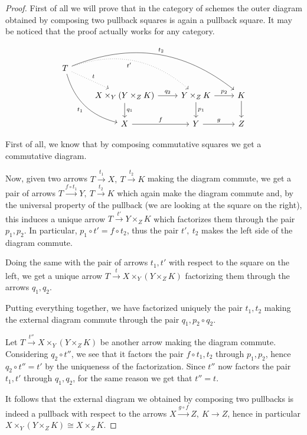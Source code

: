 \documentclass{article}
\begin{document}
\begin{proof}
    First of all we will prove that in the category of schemes the outer
    diagram obtained by composing two pullback squares is again a pullback
    square. It may be noticed that the proof actually works for any
    category.
    \[
	\begin{tikzcd}
        	T\arrow[bend left]{drrr}{t_2}\arrow[dotted, bend left, swap]{drr}{t'}\arrow[dotted]{dr}{t}\arrow[bend right, swap]{ddr}{t_1} \\
		& X\times_Y (Y\times_Z K)\arrow{r}{q_2}\arrow{d}{q_1}
		& Y\times_Z K\arrow{d}{p_1}\arrow{r}{p_2}
		& K\arrow{d} \\
		& X\arrow{r}{f}
		& Y\arrow{r}{g}
		& Z
	\end{tikzcd}
    \]
	
    First of all, we know that by composing commutative squares we get a
    commutative diagram.
	
    Now, given two arrows $T\xrightarrow{t_1} X,\ T\xrightarrow{t_2} K$
    making the diagram commute, we get a pair of arrows
    $T\xrightarrow{f\circ t_1} Y,\ T\xrightarrow{t_2} K$ which again make
    the diagram commute and, by the universal property of the pullback (we
    are looking at the square on the right), this induces a unique arrow
    $T\xrightarrow{t'} Y\times_Z K$ which factorizes them through the pair
    $p_1,p_2$. In particular, $p_1\circ t'=f\circ t_2$, thus the pair $t',\
    t_2$ makes the left side of the diagram commute.
	
    Doing the same with the pair of arrows $t_1,t'$ with respect to the
    square on the left, we get a unique arrow $T\xrightarrow{t} X\times_Y
    (Y\times_Z K)$ factorizing them through the arrows $q_1,q_2$.
	
    Putting everything together, we have factorized uniquely the pair
    $t_1,t_2$ making the external diagram commute through the pair
    $q_1,p_2\circ q_2$.
	
    Let $T\xrightarrow{t''} X\times_Y (Y\times_Z K)$ be another arrow making
    the diagram commute. Considering $q_2\circ t''$, we see that it factors
    the pair $f\circ t_1,t_2$ through $p_1,p_2$, hence $q_2\circ t''=t'$ by
    the uniqueness of the factorization. Since $t''$ now factors the pair
    $t_1,t'$ through $q_1,q_2$, for the same reason we get that $t''=t$.
	
    It follows that the external diagram we obtained by composing two
    pullbacks is indeed a pullback with respect to the arrows
    $X\xrightarrow{g\circ f} Z,\ K\rightarrow Z$, hence in particular
    $X\times_Y (Y\times_Z K)\cong X\times_Z K$.
	

\end{proof}
\end{document}
